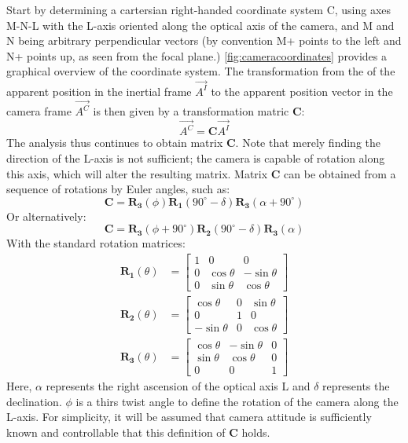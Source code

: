 Start by determining a cartersian right-handed coordinate system C, using axes M-N-L with the L-axis oriented along the optical axis of the camera, and M and N being arbitrary perpendicular vectors (by convention M+ points to the left and N+ points up, as seen from the focal plane.) \autoref{fig:cameracoordinates} provides a graphical overview of the coordinate system. The transformation from the of the apparent position in the inertial frame $\vec{A^I}$ to the apparent position vector in the camera frame $\vec{A^C}$ is then given by a transformation matric $\mathbf{C}$:
\begin{equation}
    \vec{A^C} = \mathbf{C}\vec{A^I}
\end{equation}
The analysis thus continues to obtain matrix $\mathbf{C}$. Note that merely finding the direction of the L-axis is not sufficient; the camera is capable of rotation along this axis, which will alter the resulting matrix. Matrix $\mathbf{C}$ can be obtained from a sequence of rotations by Euler angles, such as:
\begin{equation}
    \mathbf{C} = \mathbf{R_3}(\phi)\mathbf{R_1}(90^\circ - \delta)\mathbf{R_3}(\alpha + 90^\circ)
\end{equation}
Or alternatively:
\begin{equation}
    \mathbf{C} = \mathbf{R_3}(\phi + 90^\circ)\mathbf{R_2}(90^\circ - \delta)\mathbf{R_3}(\alpha)
\end{equation}
With the standard rotation matrices:
\begin{align}
    \mathbf{R_1}(\theta) &= \begin{bmatrix} 1 & 0 & 0 \\ 0 & \cos{\theta} & -\sin{\theta} \\ 0 & \sin{\theta} & \cos{\theta} \end{bmatrix} \\
    \mathbf{R_2}(\theta) &= \begin{bmatrix} \cos{\theta} & 0 & \sin{\theta} \\ 0 & 1 & 0 \\ -\sin{\theta} & 0 & \cos{\theta}\end{bmatrix} \\
    \mathbf{R_3}(\theta) &= \begin{bmatrix} \cos{\theta} & -\sin{\theta} & 0 \\ \sin{\theta} & \cos{\theta} & 0 \\ 0 & 0 & 1 \end{bmatrix}
\end{align}
Here, $\alpha$ represents the right ascension of the optical axis L and $\delta$ represents the declination. $\phi$ is a thirs twist angle to define the rotation of the camera along the L-axis. For simplicity, it will be assumed that camera attitude is sufficiently known and controllable that this definition of $\mathbf{C}$ holds.\\

